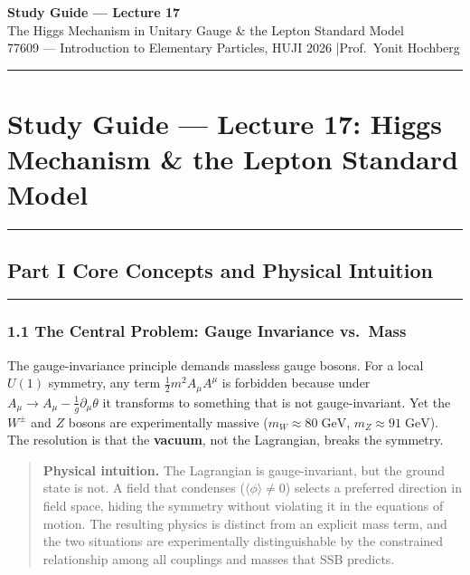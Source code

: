 \documentclass[12pt,a4paper]{article}
\begin{document}
\begin{center}
  {\LARGE\bfseries Study Guide — Lecture 17}\\[0.4em]
  {\large The Higgs Mechanism in Unitary Gauge \& the Lepton Standard Model}\\[0.3em]
  {\normalsize 77609 — Introduction to Elementary Particles, HUJI 2026
               \quad|\quad Prof.\ Yonit Hochberg}
\end{center}
\hrule
\vspace{1em}

\section*{Study Guide — Lecture 17: Higgs Mechanism \& the Lepton Standard Model}
\hrule\vspace{1.5em}

\subsection*{Part I \quad Core Concepts and Physical Intuition}
\hrule\medskip

\subsubsection*{1.1 \quad The Central Problem: Gauge Invariance vs.\ Mass}

The gauge-invariance principle demands massless gauge bosons. For a local $U(1)$ symmetry, any term $\tfrac{1}{2}m^2 A_\mu A^\mu$ is forbidden because under $A_\mu \to A_\mu - \tfrac{1}{g}\partial_\mu\theta$ it transforms to something that is not gauge-invariant. Yet the $W^\pm$ and $Z$ bosons are experimentally massive ($m_W \approx 80\;\text{GeV}$, $m_Z \approx 91\;\text{GeV}$). The resolution is that the \textbf{vacuum}, not the Lagrangian, breaks the symmetry.

\begin{quote}
\textbf{Physical intuition.} The Lagrangian is gauge-invariant, but the ground state is not. A field that condenses ($\langle\phi\rangle \neq 0$) selects a preferred direction in field space, hiding the symmetry without violating it in the equations of motion. The resulting physics is distinct from an explicit mass term, and the two situations are experimentally distinguishable by the constrained relationship among all couplings and masses that SSB predicts.
\end{quote}
\end{document}
